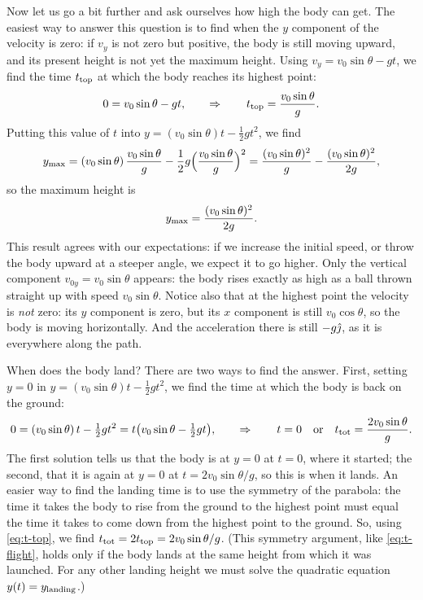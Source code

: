 \documentclass[11pt,a4paper]{article}
\begin{document}
Now let us go a bit further and ask ourselves how high the body can get. The easiest way to answer
this question is to find when the $y$ component of the velocity is zero: if $v_y$ is not zero but
positive, the body is still moving upward, and its present height is not yet the maximum height.
Using $v_y = v_0\sin\theta - gt$, we find the time $t_{\mathrm{top}}$ at which the body reaches its
highest point:
\begin{equation}\label{eq:t-top}
  0 = v_0\sin\theta - gt , \qquad \Rightarrow \qquad t_{\mathrm{top}} = \frac{v_0\sin\theta}{g} .
\end{equation}
Putting this value of $t$ into $y = (v_0\sin\theta)t - \frac12 gt^2$, we find
\[
  y_{\mathrm{max}} = (v_0\sin\theta)\,\frac{v_0\sin\theta}{g} - \frac12 g\Bigl(\frac{v_0\sin\theta}{g}\Bigr)^2
            = \frac{(v_0\sin\theta)^2}{g} - \frac{(v_0\sin\theta)^2}{2g} ,
\]
so the maximum height is
\begin{equation}\label{eq:ymax}
  y_{\mathrm{max}} = \frac{(v_0\sin\theta)^2}{2g} .
\end{equation}
This result agrees with our expectations: if we increase the initial speed, or throw the body
upward at a steeper angle, we expect it to go higher. Only the vertical component
$v_{0y} = v_0\sin\theta$ appears: the body rises exactly as high as a ball thrown straight up with
speed $v_0\sin\theta$. Notice also that at the highest point the velocity is \emph{not} zero: its
$y$ component is zero, but its $x$ component is still $v_0\cos\theta$, so the body is moving
horizontally. And the acceleration there is still $-g\hat{\jmath}$, as it is everywhere along the path.

When does the body land? There are two ways to find the answer. First, setting $y = 0$ in
$y = (v_0\sin\theta)t - \frac12 gt^2$, we find the time at which the body is back on the ground:
\begin{equation}\label{eq:t-flight}
  0 = (v_0\sin\theta)\,t - \tfrac12 gt^2 = t\bigl(v_0\sin\theta - \tfrac12 gt\bigr) ,
  \qquad \Rightarrow \qquad t = 0 \quad\text{or}\quad t_{\mathrm{tot}} = \frac{2v_0\sin\theta}{g} .
\end{equation}
The first solution tells us that the body is at $y = 0$ at $t = 0$, where it started; the second,
that it is again at $y = 0$ at $t = 2v_0\sin\theta/g$, so this is when it lands. An easier way to
find the landing time is to use the symmetry of the parabola: the time it takes the body to rise
from the ground to the highest point must equal the time it takes to come down from the highest
point to the ground. So, using \eqref{eq:t-top}, we find $t_{\mathrm{tot}} = 2t_{\mathrm{top}} =
2v_0\sin\theta/g$. (This symmetry argument, like \eqref{eq:t-flight}, holds only if the body lands
at the same height from which it was launched. For any other landing height we must solve the
quadratic equation $y(t) = y_{\mathrm{landing}}$.)
\end{document}
